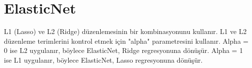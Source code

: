 \section{ElasticNet}
L1 (Lasso) ve L2 (Ridge) düzenlemesinin bir kombinasyonunu kullanır. L1 ve L2 düzenleme terimlerini kontrol etmek için "alpha" parametresini kullanır. Alpha = 0 ise L2 uygulanır, böylece ElasticNet, Ridge regresyonuna dönüşür. Alpha = 1 ise L1 uygulanır, böylece ElasticNet, Lasso regresyonuna dönüşür.

\begin{table}[h]
\centering
{\scriptsize\renewcommand{\arraystretch}{0.1}
{}}
\end{table}

\newpage